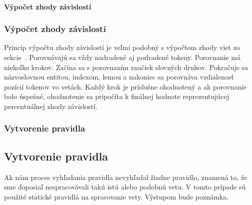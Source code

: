 %
%
{
	\paragraph{Výpočet zhody závislostí}
}
{
	\subsubsection{Výpočet zhody závislostí}
}
\label{paragraph:dependency_match}

Princíp výpočtu zhody závislostí je veľmi podobný s výpočtom zhody viet zo sekcie~. Porovnávajú sa vždy nadradené aj podradené tokeny. Porovnanie má niekoľko krokov. Začína sa s porovnaním značiek slovných druhov. Pokračuje sa názvoslovnou entitou, indexom, lemou a nakoniec sa porovnáva vzdialenosť pozícií tokenov vo vetách. Každý krok je príslušne ohodnotený a ak porovnanie bolo úspešné, ohodnotenie sa pripočíta k finálnej hodnote reprezentujúcej percentuálnej zhody závislostí.

%
%
{
	\subsubsection{Vytvorenie pravidla}
}
{
	\subsection{Vytvorenie pravidla}
}
\label{subsubsection:rule_creation}
Ak nám proces vyhľadania pravidla nevyhľadal žiadne pravidlo, znamená to, že sme doposiaľ nespracovávali takú istú alebo podobnú vetu. V tomto prípade sú použité statické pravidlá na spracovanie vety. Výstupom bude poznámka.


